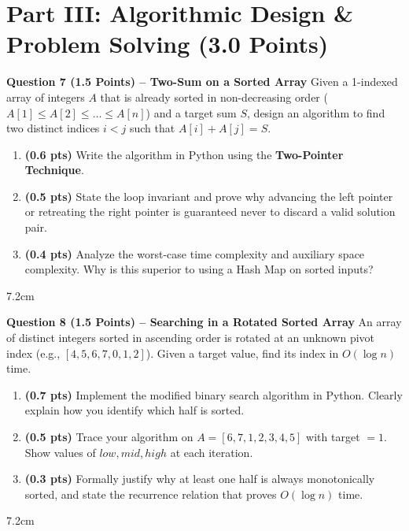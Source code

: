 \documentclass[11pt,a4paper]{article}
\begin{document}

\section*{Part III: Algorithmic Design \& Problem Solving (3.0 Points)}

\textbf{Question 7 (1.5 Points) -- Two-Sum on a Sorted Array}
Given a 1-indexed array of integers $A$ that is already sorted in non-decreasing order ($A[1] \le A[2] \le \dots \le A[n]$) and a target sum $S$, design an algorithm to find two distinct indices $i < j$ such that $A[i] + A[j] = S$.
\begin{enumerate}[label=(\alph*)]
    \item \textbf{(0.6 pts)} Write the algorithm in Python using the \textbf{Two-Pointer Technique}.
    \item \textbf{(0.5 pts)} State the loop invariant and prove why advancing the left pointer or retreating the right pointer is guaranteed never to discard a valid solution pair.
    \item \textbf{(0.4 pts)} Analyze the worst-case time complexity and auxiliary space complexity. Why is this superior to using a Hash Map on sorted inputs?
\end{enumerate}

\begin{answerbox}{7.2cm}
\end{answerbox}

\vspace{0.3em}

\textbf{Question 8 (1.5 Points) -- Searching in a Rotated Sorted Array}
An array of distinct integers sorted in ascending order is rotated at an unknown pivot index (e.g., $[4, 5, 6, 7, 0, 1, 2]$). Given a target value, find its index in $O(\log n)$ time.
\begin{enumerate}[label=(\alph*)]
    \item \textbf{(0.7 pts)} Implement the modified binary search algorithm in Python. Clearly explain how you identify which half is sorted.
    \item \textbf{(0.5 pts)} Trace your algorithm on $A = [6, 7, 1, 2, 3, 4, 5]$ with target $= 1$. Show values of $low, mid, high$ at each iteration.
    \item \textbf{(0.3 pts)} Formally justify why at least one half is always monotonically sorted, and state the recurrence relation that proves $O(\log n)$ time.
\end{enumerate}

\begin{answerbox}{7.2cm}
\end{answerbox}
\end{document}
